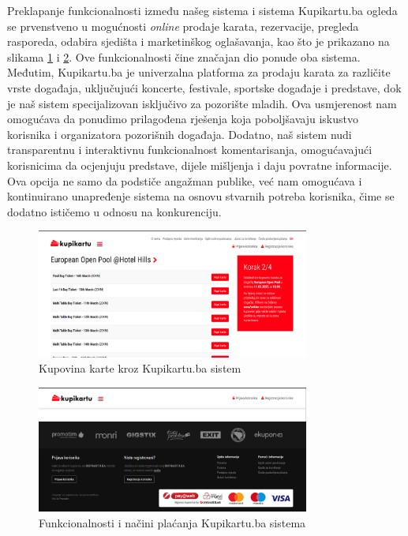 Preklapanje funkcionalnosti između našeg sistema i sistema Kupikartu.ba ogleda se prvenstveno u mogućnosti \textit{online} prodaje karata, rezervacije, pregleda rasporeda, odabira sjedišta i marketinškog oglašavanja, kao što je prikazano na slikama \ref{fig:kk2} i \ref{fig:kk3}. Ove funkcionalnosti čine značajan dio ponude oba sistema. Međutim, Kupikartu.ba je univerzalna platforma za prodaju karata za različite vrste događaja, uključujući koncerte, festivale, sportske događaje i predstave, dok je naš sistem specijalizovan isključivo za pozorište mladih. Ova usmjerenost nam omogućava da ponudimo prilagođena rješenja koja poboljšavaju iskustvo korisnika i organizatora pozorišnih događaja. Dodatno, naš sistem nudi transparentnu i interaktivnu funkcionalnost komentarisanja, omogućavajući korisnicima da ocjenjuju predstave, dijele mišljenja i daju povratne informacije. Ova opcija ne samo da podstiče angažman publike, već nam omogućava i kontinuirano unapređenje sistema na osnovu stvarnih potreba korisnika, čime se dodatno ističemo u odnosu na konkurenciju.
\sloppy 
\begin{figure}[!htb]
    \centering
    \includegraphics[width=0.8\textwidth]{Slike/kupikartu2.png}
    \caption{Kupovina karte kroz Kupikartu.ba sistem}
    \label{fig:kk2}
\end{figure}
\begin{figure}[!htb]
    \centering
    \includegraphics[width=0.8\textwidth]{Slike/kupikartu3.png}
    \caption{Funkcionalnosti i načini plaćanja Kupikartu.ba sistema}
    \label{fig:kk3}
\end{figure}

